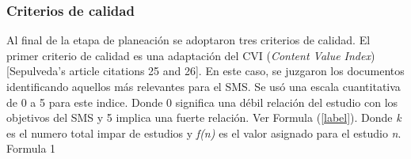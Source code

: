 \subsubsection{Criterios de calidad}
Al final de la etapa de planeación se adoptaron tres criterios de calidad.
El primer criterio de calidad es una adaptación del CVI (\textit{Content Value Index}) [Sepulveda's article citations 25 and 26]. En este caso, se juzgaron los documentos identificando aquellos más relevantes para el SMS. Se usó una escala cuantitativa de 0 a 5 para este indice. Donde 0 significa una débil relación del estudio con los objetivos del SMS y 5 implica una fuerte relación. Ver Formula (\ref{label}). Donde \textit{k} es el numero total impar de estudios y \textit{f(n)} es el valor asignado para el estudio \textit{n}.
Formula 1
